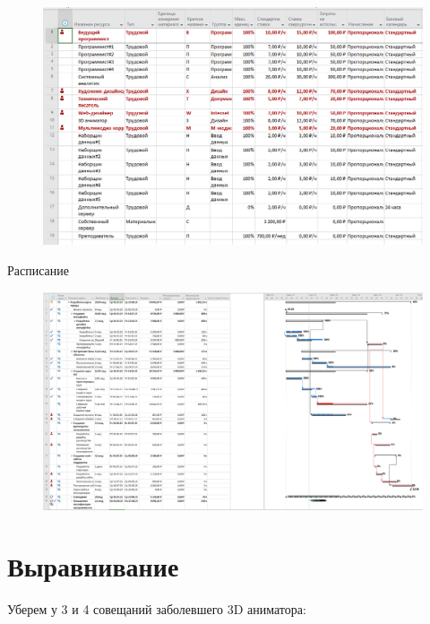 \begin{figure}[H]
	\begin{center}
		\includegraphics[width=\textwidth]{imgs/task_1_17.png}
	\end{center}
\end{figure}

Расписание

\begin{figure}[H]
	\begin{center}
		\includegraphics[width=\textwidth]{imgs/task_1_18.png}
	\end{center}
\end{figure}

\section*{Выравнивание}

Уберем у 3 и 4 совещаний заболевшего 3D аниматора:

